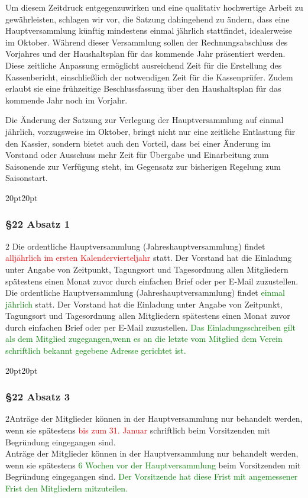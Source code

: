 \documentclass[10pt,a4paper,parskip=half]{scrartcl}
\newcommand{\new}[1]{\textcolor{Green}{#1}}
\newcommand{\old}[1]{\textcolor{Red}{#1}}
\newcommand{\change}[1]{
  \begin{adjustwidth}{20pt}{20pt}
    #1
  \end{adjustwidth}
}
\newcommand{\compare}[3]{\change{\subsubsection*{#1}\begin{multicols}{2}#2\columnbreak\\#3\end{multicols}}}
\begin{document}
  Um diesem Zeitdruck entgegenzuwirken und eine qualitativ hochwertige Arbeit zu gewährleisten, schlagen wir vor, die Satzung dahingehend zu ändern, dass eine Hauptversammlung künftig mindestens einmal jährlich stattfindet, idealerweise im Oktober. Während dieser Versammlung sollen der Rechnungsabschluss des Vorjahres und der Haushaltsplan für das kommende Jahr präsentiert werden. Diese zeitliche Anpassung ermöglicht ausreichend Zeit für die Erstellung des Kassenbericht, einschließlich der notwendigen Zeit für die Kassenprüfer. Zudem erlaubt sie eine frühzeitige Beschlussfassung über den Haushaltsplan für das kommende Jahr noch im Vorjahr.

  Die Änderung der Satzung zur Verlegung der Hauptversammlung auf einmal jährlich, vorzugsweise im Oktober, bringt nicht nur eine zeitliche Entlastung für den Kassier, sondern bietet auch den Vorteil, dass bei einer Änderung im Vorstand oder Ausschuss mehr Zeit für Übergabe und Einarbeitung zum Saisonende zur Verfügung steht, im Gegensatz zur bisherigen Regelung zum Saisonstart.
  
  \compare{§22 Absatz 1}{
    Die ordentliche Hauptversammlung (Jahreshauptversammlung) findet \old{alljährlich im ersten Kalendervierteljahr} statt.
    Der Vorstand hat die Einladung unter Angabe von Zeitpunkt,
    Tagungsort und Tagesordnung allen Mitgliedern spätestens einen Monat zuvor durch einfachen Brief oder per E-Mail zuzustellen.
  }{
    Die ordentliche Hauptversammlung (Jahreshauptversammlung) findet \new{einmal jährlich} statt.
    Der Vorstand hat die Einladung unter Angabe von Zeitpunkt,
    Tagungsort und Tagesordnung allen Mitgliedern spätestens einen Monat zuvor durch einfachen Brief oder per E-Mail zuzustellen.
    \new{Das Einladungsschreiben gilt als dem Mitglied zugegangen,wenn es an die letzte vom Mitglied dem Verein schriftlich bekannt gegebene Adresse gerichtet ist.}
  }

  \compare{§22 Absatz 3}{Anträge der Mitglieder können in der Haupt\-ver\-samm\-lung nur behandelt werden,
  wenn sie spätestens \old{bis zum 31. Januar} schriftlich beim Vorsitzenden mit Begründung eingegangen sind.}
  {Anträge der Mitglieder können in der Haupt\-ver\-samm\-lung nur behandelt werden,
  wenn sie spätestens \new{6 Wochen vor der Hauptversammlung} beim Vorsitzenden mit Begründung eingegangen sind.
  \new{Der Vorsitzende hat diese Frist mit angemessener Frist den Mitgliedern mitzuteilen.}
  }
\end{document}
